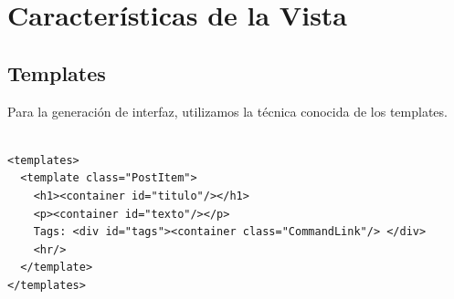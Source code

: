 %
%
%
%
%


\section{Características de la Vista}
\label{sec-view}
\subsection{Templates}
\label{sub-templates}
Para la generación de interfaz, utilizamos la técnica conocida de los templates.

\begin{verbatim}

<templates>
  <template class="PostItem">
    <h1><container id="titulo"/></h1>
    <p><container id="texto"/></p>
    Tags: <div id="tags"><container class="CommandLink"/> </div>
    <hr/>
  </template>
</templates>

\end{verbatim}

